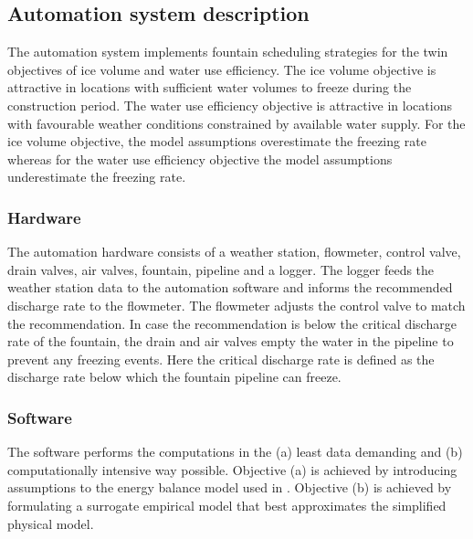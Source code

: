 \documentclass[tc, manuscript]{copernicus}
\begin{document}
\subsection{Automation system description}

The automation system implements fountain scheduling strategies for the twin objectives of ice volume and water
use efficiency. The ice volume objective is attractive in locations with sufficient water volumes to freeze
during the construction period. The water use efficiency objective is attractive in locations with favourable
weather conditions constrained by available water supply. For the ice volume objective, the model assumptions
overestimate the freezing rate whereas for the water use efficiency objective the model assumptions
underestimate the freezing rate. 

\subsubsection{Hardware}
The automation hardware consists of a weather station, flowmeter, control valve, drain valves, air valves,
fountain, pipeline and a logger. The logger feeds the weather station data to the automation software and
informs the recommended discharge rate to the flowmeter. The flowmeter adjusts the control valve to match the
recommendation. In case the recommendation is below the critical discharge rate of the fountain, the drain and
air valves empty the water in the pipeline to prevent any freezing events. Here the critical discharge rate is
defined as the discharge rate below which the fountain pipeline can freeze.


\subsubsection{Software}


The software performs the computations in the (a) least data demanding and (b) computationally intensive way
possible. Objective (a) is achieved by introducing assumptions to the energy balance model used in
\citet{balasubramanianInfluenceMeteorologicalConditions2022}. Objective (b) is achieved by formulating a
surrogate empirical model that best approximates the simplified physical model. 
\end{document}
